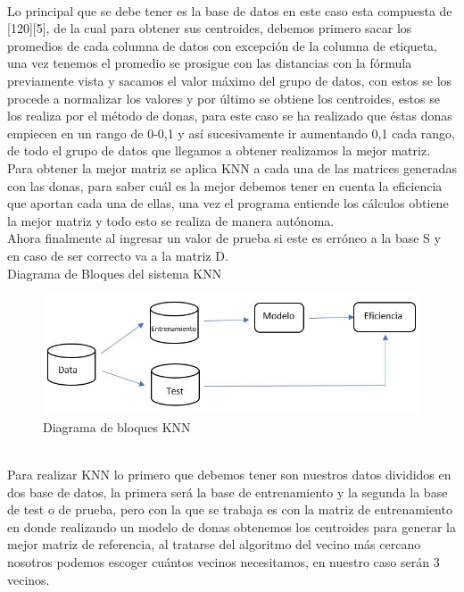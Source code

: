 \documentclass[10pt,a4paper]{article}
\begin{document}
\\
Lo principal que se debe tener es la base de datos en este caso esta compuesta de [120][5], de la cual para obtener sus centroides, debemos primero sacar los promedios de cada columna de datos con excepción de la columna de etiqueta, una vez tenemos el promedio se prosigue con las distancias con la fórmula previamente vista y sacamos el valor máximo del grupo de datos, con estos se los procede a normalizar  los valores y por último se obtiene los centroides, estos se los realiza por el método de donas, para este caso se ha realizado que éstas donas empiecen en un rango de 0-0,1 y así sucesivamente ir aumentando 0,1 cada rango, de todo el grupo de datos que llegamos a obtener realizamos la mejor matriz.\\
Para obtener la mejor matriz se aplica KNN a cada una de las matrices generadas con las donas, para saber cuál es la mejor debemos tener en cuenta la eficiencia que aportan cada una de ellas, una vez el programa entiende los cálculos obtiene la mejor matriz y todo esto se realiza de manera autónoma.\\
Ahora finalmente al ingresar un valor de prueba si este es erróneo a la base S y en caso de ser correcto va a la matriz D.
\\

Diagrama de Bloques del sistema KNN
\begin{figure}[H]
\caption{Diagrama de bloques KNN} %
\centering
\includegraphics[scale=0.8]{dbknn.png}
\end{figure}
\\
Para realizar KNN lo primero que debemos tener son nuestros datos divididos en dos base de datos, la primera será la base de entrenamiento y la segunda la base de test o de prueba, pero con la que se trabaja es con la matriz de entrenamiento en donde realizando un modelo de donas obtenemos los centroides para generar la mejor matriz de referencia, al tratarse del algoritmo del vecino más cercano nosotros podemos escoger cuántos vecinos necesitamos, en nuestro caso serán 3 vecinos.
\end{document}
